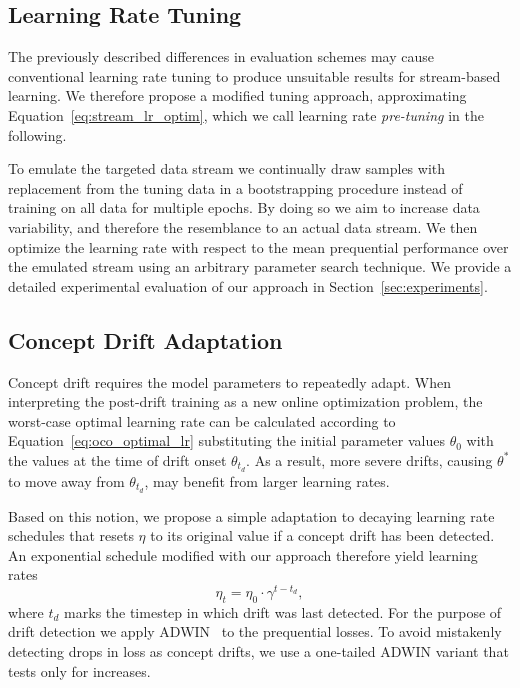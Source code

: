 \documentclass[runningheads]{llncs}
\begin{document}
\subsection{Learning Rate Tuning}\label{subsec:pre-tuning}

The previously described differences in evaluation schemes may cause conventional learning rate tuning to produce unsuitable results for stream-based learning.
We therefore propose a modified tuning approach, approximating Equation~\eqref{eq:stream_lr_optim}, which we call learning rate \textit{pre-tuning} in the following.

To emulate the targeted data stream we continually draw samples with replacement from the tuning data in a bootstrapping procedure instead of training on all data for multiple epochs.
By doing so we aim to increase data variability, and therefore the resemblance to an actual data stream.
We then optimize the learning rate with respect to the mean prequential performance over the emulated stream using an arbitrary parameter search technique.
We provide a detailed experimental evaluation of our approach in Section~\ref{sec:experiments}.

\subsection{Concept Drift Adaptation}

Concept drift requires the model parameters to repeatedly adapt.
When interpreting the post-drift training as a new online optimization problem, the worst-case optimal learning rate can be calculated according to Equation~\ref{eq:oco_optimal_lr} substituting the initial parameter values $\theta_0$ with the values at the time of drift onset $\theta_{t_d}$.
As a result, more severe drifts, causing $\theta^*$ to move away from $\theta_{t_d}$, may benefit from larger learning rates.

Based on this notion, we propose a simple adaptation to decaying learning rate schedules that resets $\eta$ to its original value if a concept drift has been detected.
An exponential schedule modified with our approach therefore yield learning rates
\begin{equation}
	\eta_t = \eta_0 \cdot \gamma^{t-t_d},
\end{equation}\label{eq:drift_reset}
where $t_d$ marks the timestep in which drift was last detected.
For the purpose of drift detection we apply ADWIN~\cite{bifetLearningTimeChangingData2007} to the prequential losses.
To avoid mistakenly detecting drops in loss as concept drifts, we use a one-tailed ADWIN variant that tests only for increases.
\end{document}
